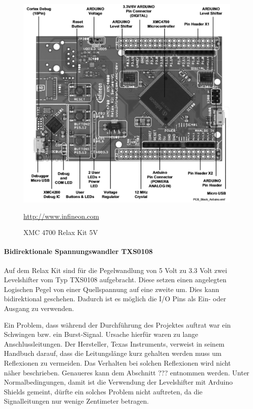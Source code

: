\begin{figure}[h]
	\centering
	\includegraphics[width=\textwidth-6cm]{hardware/graphics/XMC_4700_Board_overview}
	\caption{XMC 4700 Relax Kit 5V}
	\quelle \url{http://www.infineon.com}
	\label{fig:XMC4700}	
\end{figure}

\paragraph{Bidirektionale Spannungswandler TXS0108}
Auf dem Relax Kit sind für die Pegelwandlung von 5 Volt zu 3.3 Volt zwei Levelshifter vom Typ TXS0108 aufgebracht.
Diese setzen einen angelegten Logischen Pegel von einer Quellspannung auf eine zweite um.
Dies kann bidirektional geschehen.
Dadurch ist es möglich die I/O Pins als Ein- oder Ausgang zu verwenden.

Ein Problem, dass während der Durchführung des Projektes auftrat war ein Schwingen bzw. ein Burst-Signal. 
Ursache hierfür waren zu lange Anschlussleitungen.
Der Hersteller, Texas Instruments, verweist in seinem Handbuch darauf, dass die Leitungslänge kurz gehalten werden muss um Reflexionen zu vermeiden.
Das Verhalten bei solchen Reflexionen wird nicht näher beschrieben.
Genaueres kann dem Abschnitt ??? entnommen werden.
Unter Normalbedingungen, damit ist die Verwendung der Levelshifter mit Arduino Shields gemeint, dürfte ein solches Problem nicht auftreten, da die Signalleitungen nur wenige Zentimeter betragen.

